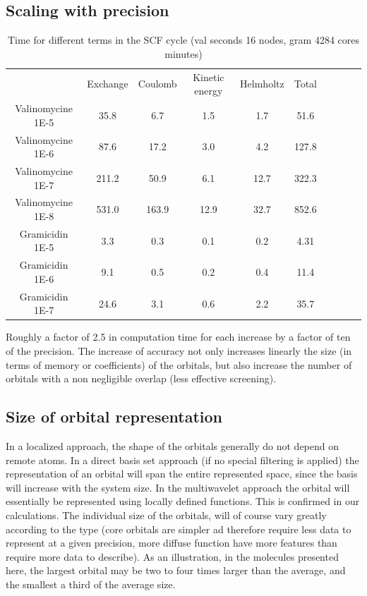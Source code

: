 \documentclass{article}
\begin{document}
\subsection{Scaling with precision}

\begin{table}[t]
    \centering
    \begin{tabular}{cccccccccc}
& Exchange &  Coulomb & Kinetic energy& Helmholtz & Total \\
 Valinomycine 1E-5& 35.8&6.7 & 1.5 & 1.7 & 51.6\\
Valinomycine 1E-6& 87.6 &17.2 & 3.0& 4.2 &127.8\\
Valinomycine 1E-7& 211.2& 50.9& 6.1&12.7& 322.3 \\
Valinomycine 1E-8  & 531.0& 163.9& 12.9&32.7& 852.6 \\
 Gramicidin 1E-5&3.3& 0.3 & 0.1& 0.2&4.31 \\
  Gramicidin 1E-6& 9.1& 0.5& 0.2& 0.4&11.4\\
  Gramicidin 1E-7& 24.6&3.1& 0.6& 2.2&  35.7\\
    \end{tabular}
    \caption{Time for different terms in the SCF cycle (val seconds 16 nodes, gram 4284 cores minutes)}
    \label{tab:times}
\end{table}

Roughly a factor of 2.5 in computation time for each increase by a factor of ten of the precision.
The increase of accuracy not only increases linearly the size (in terms of memory or coefficients) of the orbitals, but also increase the number of orbitals with a non negligible overlap (less effective screening).


\subsection{Size of orbital representation}
\label{sizes}

In a localized approach, the shape of the orbitals generally do not depend on remote atoms. In a direct basis set approach (if no special filtering is applied) the representation of an orbital will span the entire represented space, since the basis will increase with the system size. In the multiwavelet approach the orbital will essentially be represented using locally defined functions.
This is confirmed in our calculations.
The individual size of the orbitals, will of course vary greatly according to the type (core orbitals are simpler ad therefore require less data to represent at a given precision, more diffuse function have more features than require more data to describe). As an illustration, in the molecules presented here, the largest orbital may be two to four times larger than the average, and the smallest a third of the average size.
\end{document}
